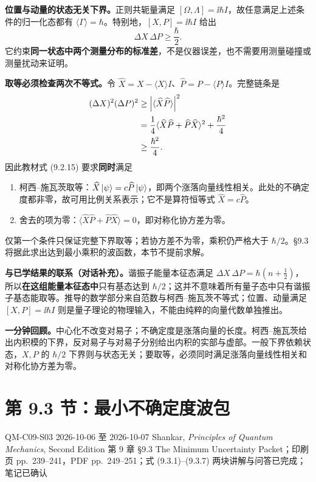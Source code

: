 \textbf{位置与动量的状态无关下界。}正则共轭量满足 $[\Omega,\Lambda]=\ii\hbar I$，故任意满足上述条件的归一化态都有 $\langle\Gamma\rangle=\hbar$。特别地，$[X,P]=\ii\hbar I$ 给出
\begin{equation}
  \boxed{\Delta X\,\Delta P\ge\frac{\hbar}{2}}.
  \label{eq:QM-C09-S02-xp-bound}
\end{equation}
它约束\textbf{同一状态中两个测量分布的标准差}，不是仪器误差，也不需要用测量碰撞或测量扰动来证明。

\textbf{取等必须检查两次不等式。}令 $\widehat X=X-\langle X\rangle I$、$\widehat P=P-\langle P\rangle I$。完整链条是
\begin{align}
  (\Delta X)^2(\Delta P)^2
  &\ge\left|\langle\widehat X\widehat P\rangle\right|^2\notag\\
  &=\frac14\langle\widehat X\widehat P+
                 \widehat P\widehat X\rangle^2
    +\frac{\hbar^2}{4}\notag\\
  &\ge\frac{\hbar^2}{4}.
\end{align}
因此教材式 (9.2.15) 要求\textbf{同时}满足
\begin{enumerate}
  \item 柯西--施瓦茨取等：$\widehat X\left|\psi\right\rangle=c\widehat P\left|\psi\right\rangle$，即两个涨落向量线性相关。此处的不确定度都非零，故可用比例关系表示；它不是算符恒等式 $\widehat X=c\widehat P$。
  \item 舍去的项为零：$\langle\widehat X\widehat P+\widehat P\widehat X\rangle=0$，即对称化协方差为零。
\end{enumerate}
仅第一个条件只保证完整下界取等；若协方差不为零，乘积仍严格大于 $\hbar/2$。\S 9.3 将据此求出达到最小乘积的波函数，本节不提前求解。

\textbf{与已学结果的联系（对话补充）。}谐振子能量本征态满足 $\Delta X\,\Delta P=\hbar(n+\tfrac12)$，所以\textbf{在这组能量本征态中}只有基态达到 $\hbar/2$；这并不意味着所有量子态中只有谐振子基态能取等。推导的数学部分来自范数与柯西--施瓦茨不等式；位置、动量满足 $[X,P]=\ii\hbar I$ 则是量子理论的物理输入，不能由纯粹的向量代数单独推出。

\textbf{一分钟回顾。}中心化不改变对易子；不确定度是涨落向量的长度。柯西--施瓦茨给出内积模的下界，反对易子与对易子分别给出内积的实部与虚部。一般下界依赖状态，$X,P$ 的 $\hbar/2$ 下界则与状态无关；要取等，必须同时满足涨落向量线性相关和对称化协方差为零。

\section{第 9.3 节：最小不确定度波包}
\label{section:QM-C09-S03}
\studymeta
  {QM-C09-S03}
  {2026-10-06 至 2026-10-07}
  {Shankar, \textit{Principles of Quantum Mechanics}, Second Edition}
  {第 9 章 \S 9.3 The Minimum Uncertainty Packet；印刷页 pp.~239--241，PDF pp.~249--251；式 (9.3.1)--(9.3.7)}
  {两块讲解与问答已完成；笔记已确认}

